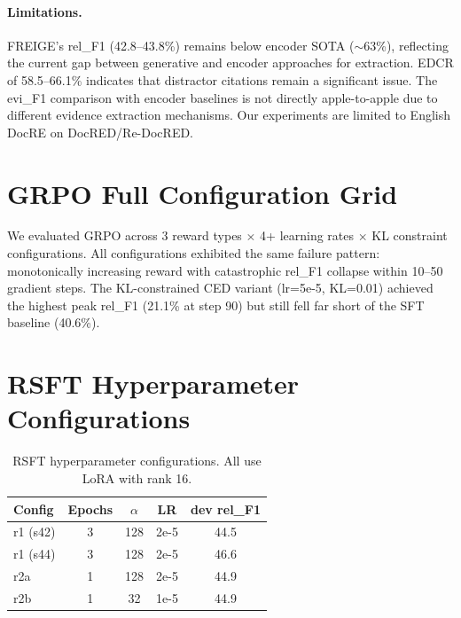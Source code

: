 \documentclass[11pt,a4paper]{article}
\newcommand{\method}{FREIGE}
\begin{document}
\paragraph{Limitations.}
\method{}'s rel\_F1 (42.8--43.8\%) remains below encoder SOTA ($\sim$63\%), reflecting the current gap between generative and encoder approaches for extraction. EDCR of 58.5--66.1\% indicates that distractor citations remain a significant issue. The evi\_F1 comparison with encoder baselines is not directly apple-to-apple due to different evidence extraction mechanisms. Our experiments are limited to English DocRE on DocRED/Re-DocRED.



\appendix

\section{GRPO Full Configuration Grid}
\label{app:grpo}

We evaluated GRPO across 3 reward types $\times$ 4+ learning rates $\times$ KL constraint configurations. All configurations exhibited the same failure pattern: monotonically increasing reward with catastrophic rel\_F1 collapse within 10--50 gradient steps. The KL-constrained CED variant (lr=5e-5, KL=0.01) achieved the highest peak rel\_F1 (21.1\% at step 90) but still fell far short of the SFT baseline (40.6\%).

\section{RSFT Hyperparameter Configurations}
\label{app:rsft}

\begin{table}[h]
\centering
\small
\begin{tabular}{lcccc}
\toprule
\textbf{Config} & \textbf{Epochs} & $\alpha$ & \textbf{LR} & \textbf{dev rel\_F1} \\
\midrule
r1 (s42) & 3 & 128 & 2e-5 & 44.5 \\
r1 (s44) & 3 & 128 & 2e-5 & 46.6 \\
r2a & 1 & 128 & 2e-5 & 44.9 \\
r2b & 1 & 32 & 1e-5 & 44.9 \\
\bottomrule
\end{tabular}
\caption{RSFT hyperparameter configurations. All use LoRA with rank 16.}
\end{table}
\end{document}
